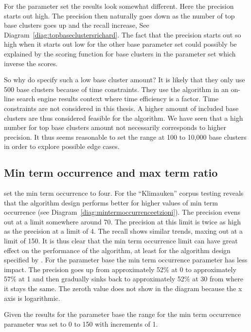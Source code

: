 For the \citeauthor{Moe2014compact} parameter set the results look somewhat different. Here the precision starts out high. The precision then naturally goes down as the number of top base clusters goes up and the recall increase, See Diagram~\ref{diag:topbaseclustersrichard}. The fact that the precision starts out so high when it starts out low for the other base parameter set could possibly be explained by the scoring function for base clusters in the \citeauthor{Moe2014compact} parameter set which inverse the scores.

So why do \cite{Oren1998} specify such a low base cluster amount? It is likely that they only use 500 base clusters because of time constraints. They use the algorithm in an on-line search engine results context where time efficiency is a factor. Time constraints are not considered in this thesis. A higher amount of included base clusters are thus considered feasible for the algorithm. We have seen that a high number for top base clusters amount not necessarily corresponds to higher precision. It thus seems reasonable to set the range at 100 to 10,000 base clusters in order to explore possible edge cases.

\subsection{Min term occurrence and max term ratio}
\citeauthor{Oren1998} set the min term occurrence to four. For the ``Klimauken'' corpus testing reveals that the \citeauthor{Oren1998} algorithm design performs better for higher values of min term occurrence (see Diagram~\ref{diag:mintermoccurrenceetzioni}). The precision evens out at a limit somewhere around 70. The precision at this limit is twice as high as the precision at a limit of 4. The recall shows similar trends, maxing out at a limit of 150. It is thus clear that the min term occurrence limit can have great effect on the performance of the \CTC algorithm, at least for the algorithm design specified by \citeauthor{Oren1998}. For the \citeauthor{Moe2014compact} parameter base the min term occurrence parameter has less impact. The precision goes up from approximately 52\% at 0 to approximately 57\% at 1 and then gradually sinks back to approximately 52\% at 30 from where it stays the same. The zeroth value does not show in the diagram because the x axis is logarithmic.

Given the results for the \citeauthor{Oren1998} parameter base the range for the min term occurrence parameter was set to 0 to 150 with increments of 1.

